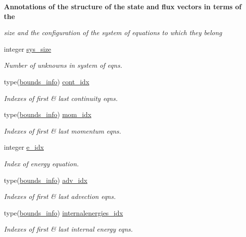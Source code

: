 \begin{Indent}\textbf{ Annotations of the structure of the state and flux vectors in terms of the}\par
{\em size and the configuration of the system of equations to which they belong }\begin{DoxyCompactItemize}
\item 
integer \hyperlink{namespacem__global__parameters_a4dac2e4ead915635e0c6c33af87be01b}{sys\+\_\+size}
\begin{DoxyCompactList}\small\item\em Number of unknowns in system of eqns. \end{DoxyCompactList}\item 
type(\hyperlink{structm__derived__types_1_1bounds__info}{bounds\+\_\+info}) \hyperlink{namespacem__global__parameters_adefe3b78bf286d73a56aef49880dfb0d}{cont\+\_\+idx}
\begin{DoxyCompactList}\small\item\em Indexes of first \& last continuity eqns. \end{DoxyCompactList}\item 
type(\hyperlink{structm__derived__types_1_1bounds__info}{bounds\+\_\+info}) \hyperlink{namespacem__global__parameters_ad138d35528cf27ff42dba00d13c269be}{mom\+\_\+idx}
\begin{DoxyCompactList}\small\item\em Indexes of first \& last momentum eqns. \end{DoxyCompactList}\item 
integer \hyperlink{namespacem__global__parameters_ac6ef72ca6aa7a22e60c864df25559892}{e\+\_\+idx}
\begin{DoxyCompactList}\small\item\em Index of energy equation. \end{DoxyCompactList}\item 
type(\hyperlink{structm__derived__types_1_1bounds__info}{bounds\+\_\+info}) \hyperlink{namespacem__global__parameters_ae8e6c40b6ec73cb126b0cce7496e0057}{adv\+\_\+idx}
\begin{DoxyCompactList}\small\item\em Indexes of first \& last advection eqns. \end{DoxyCompactList}\item 
type(\hyperlink{structm__derived__types_1_1bounds__info}{bounds\+\_\+info}) \hyperlink{namespacem__global__parameters_aac5ed9f316eeebbe04258bb1120cbea4}{internalenergies\+\_\+idx}
\begin{DoxyCompactList}\small\item\em Indexes of first \& last internal energy eqns. \end{DoxyCompactList}\item 

\end{DoxyCompactItemize}
\end{Indent}
